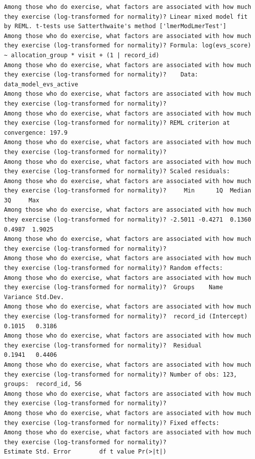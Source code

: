 \documentclass[
  12pt,
]{article}
\begin{document}
\begin{verbatim}
Among those who do exercise, what factors are associated with how much they exercise (log-transformed for normality)? Linear mixed model fit by REML. t-tests use Satterthwaite's method ['lmerModLmerTest']
Among those who do exercise, what factors are associated with how much they exercise (log-transformed for normality)? Formula: log(evs_score) ~ allocation_group * visit + (1 | record_id)
Among those who do exercise, what factors are associated with how much they exercise (log-transformed for normality)?    Data: data_model_evs_active
Among those who do exercise, what factors are associated with how much they exercise (log-transformed for normality)? 
Among those who do exercise, what factors are associated with how much they exercise (log-transformed for normality)? REML criterion at convergence: 197.9
Among those who do exercise, what factors are associated with how much they exercise (log-transformed for normality)? 
Among those who do exercise, what factors are associated with how much they exercise (log-transformed for normality)? Scaled residuals: 
Among those who do exercise, what factors are associated with how much they exercise (log-transformed for normality)?     Min      1Q  Median      3Q     Max 
Among those who do exercise, what factors are associated with how much they exercise (log-transformed for normality)? -2.5011 -0.4271  0.1360  0.4987  1.9025 
Among those who do exercise, what factors are associated with how much they exercise (log-transformed for normality)? 
Among those who do exercise, what factors are associated with how much they exercise (log-transformed for normality)? Random effects:
Among those who do exercise, what factors are associated with how much they exercise (log-transformed for normality)?  Groups    Name        Variance Std.Dev.
Among those who do exercise, what factors are associated with how much they exercise (log-transformed for normality)?  record_id (Intercept) 0.1015   0.3186  
Among those who do exercise, what factors are associated with how much they exercise (log-transformed for normality)?  Residual              0.1941   0.4406  
Among those who do exercise, what factors are associated with how much they exercise (log-transformed for normality)? Number of obs: 123, groups:  record_id, 56
Among those who do exercise, what factors are associated with how much they exercise (log-transformed for normality)? 
Among those who do exercise, what factors are associated with how much they exercise (log-transformed for normality)? Fixed effects:
Among those who do exercise, what factors are associated with how much they exercise (log-transformed for normality)?                                 Estimate Std. Error        df t value Pr(>|t|)    

\end{verbatim}
\end{document}
